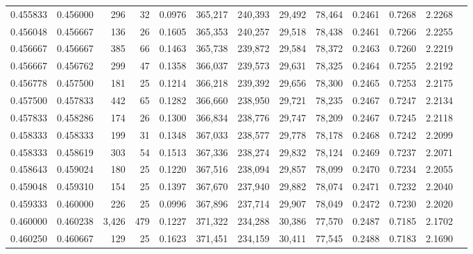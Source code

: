 \begin{tabular}{rrrrrrrrrrrrr}
0.455833 & 0.456000 &   296 &  32 &                                     0.0976 & 365,217 & 240,393 &  29,492 &  78,464 & 0.2461 & 0.7268 & 2.2268 \\
0.456048 & 0.456667 &   136 &  26 &                                     0.1605 & 365,353 & 240,257 &  29,518 &  78,438 & 0.2461 & 0.7266 & 2.2255 \\
0.456667 & 0.456667 &   385 &  66 &                                     0.1463 & 365,738 & 239,872 &  29,584 &  78,372 & 0.2463 & 0.7260 & 2.2219 \\
0.456667 & 0.456762 &   299 &  47 &                                     0.1358 & 366,037 & 239,573 &  29,631 &  78,325 & 0.2464 & 0.7255 & 2.2192 \\
0.456778 & 0.457500 &   181 &  25 &                                     0.1214 & 366,218 & 239,392 &  29,656 &  78,300 & 0.2465 & 0.7253 & 2.2175 \\
0.457500 & 0.457833 &   442 &  65 &                                     0.1282 & 366,660 & 238,950 &  29,721 &  78,235 & 0.2467 & 0.7247 & 2.2134 \\
0.457833 & 0.458286 &   174 &  26 &                                     0.1300 & 366,834 & 238,776 &  29,747 &  78,209 & 0.2467 & 0.7245 & 2.2118 \\
0.458333 & 0.458333 &   199 &  31 &                                     0.1348 & 367,033 & 238,577 &  29,778 &  78,178 & 0.2468 & 0.7242 & 2.2099 \\
0.458333 & 0.458619 &   303 &  54 &                                     0.1513 & 367,336 & 238,274 &  29,832 &  78,124 & 0.2469 & 0.7237 & 2.2071 \\
0.458643 & 0.459024 &   180 &  25 &                                     0.1220 & 367,516 & 238,094 &  29,857 &  78,099 & 0.2470 & 0.7234 & 2.2055 \\
0.459048 & 0.459310 &   154 &  25 &                                     0.1397 & 367,670 & 237,940 &  29,882 &  78,074 & 0.2471 & 0.7232 & 2.2040 \\
0.459333 & 0.460000 &   226 &  25 &                                     0.0996 & 367,896 & 237,714 &  29,907 &  78,049 & 0.2472 & 0.7230 & 2.2020 \\
0.460000 & 0.460238 & 3,426 & 479 &                                     0.1227 & 371,322 & 234,288 &  30,386 &  77,570 & 0.2487 & 0.7185 & 2.1702 \\
0.460250 & 0.460667 &   129 &  25 &                                     0.1623 & 371,451 & 234,159 &  30,411 &  77,545 & 0.2488 & 0.7183 & 2.1690 \\

\end{tabular}

